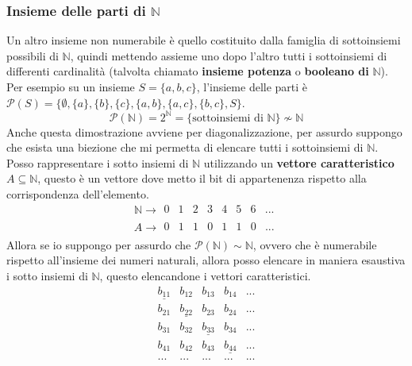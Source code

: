 \documentclass{article}
\begin{document}
\subsubsection{Insieme delle parti di $\mathbb{N}$}
Un altro insieme non numerabile è quello costituito dalla famiglia di sottoinsiemi possibili di $\mathbb{N}$,
quindi mettendo assieme uno dopo l'altro tutti i sottoinsiemi di differenti cardinalità (talvolta chiamato
\textbf{insieme potenza} o \textbf{booleano di} $\mathbb{N}$). Per esempio su un insieme $S=\{a,b,c\}$,
l'insieme delle parti è $\mathcal{P}(S)=\{\emptyset,\{a\},\{b\},\{c\},\{a,b\},\{a,c\},\{b,c\},S\}$.
$$\mathcal{P}(\mathbb{N})=2^{\mathbb{N}} = \{\text{sottoinsiemi di }\mathbb{N}\}\nsim\mathbb{N}$$
Anche questa dimostrazione avviene per diagonalizzazione, per assurdo suppongo che esista una
biezione che mi permetta di elencare tutti i sottoinsiemi di $\mathbb{N}$.
Posso rappresentare i sotto insiemi di $\mathbb{N}$ utilizzando un \textbf{vettore caratteristico}
$A\subseteq\mathbb{N}$, questo è un vettore dove metto il bit di appartenenza rispetto alla corrispondenza
dell'elemento.
\[
    \mathbb{N}\rightarrow
    \begin{array}{cccccccc}
        0 & 1 & 2 & 3 & 4 & 5 & 6 & ... \\
    \end{array}
\]
\[
    A\rightarrow
    \begin{array}{cccccccc}
        0 & 1 & 1 & 0 & 1 & 1 & 0 & ... \\
    \end{array}
\]
Allora se io suppongo per assurdo che $\mathcal{P}(\mathbb{N})\sim\mathbb{N}$, ovvero che è numerabile
rispetto all'insieme dei numeri naturali, allora posso elencare in maniera esaustiva i sotto insiemi
di $\mathbb{N}$, questo elencandone i vettori caratteristici.
\[
    \begin{array}{ccccc}
        \underline{b_{11}} & b_{12}             & b_{13}             & b_{14}             & ... \\
        b_{21}             & \underline{b_{22}} & b_{23}             & b_{24}             & ... \\
        b_{31}             & b_{32}             & \underline{b_{33}} & b_{34}             & ... \\
        b_{41}             & b_{42}             & b_{43}             & \underline{b_{44}} & ... \\
        ...                  & ...                  & ...                  & ...                  & ... \\
    \end{array}
\]
\end{document}
